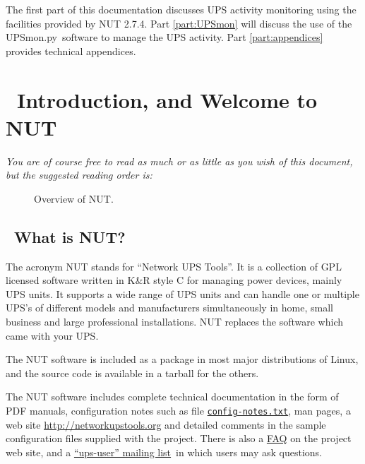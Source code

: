 \documentclass[12pt]{article}
\newlength{\headersep}\setlength{\headersep}{3mm}
\newcommand{\Hsep}{\hspace{\headersep}}
\newcommand{\newcolumn}{\vfill\eject}
\newcommand{\UPSmon}{\mbox{\textcolor{UPSMONCOLOUR}{UPSmon.py}}}
\newcommand{\mailinglist}{\href{https://lists.alioth.debian.org/mailman/listinfo/nut-upsuser}%
                               {``ups-user'' mailing list}}
\begin{document}
The first part of this documentation discusses UPS activity monitoring using
the facilities provided by NUT 2.7.4.  Part \ref{part:UPSmon} will discuss the
use of the \UPSmon\ software to manage the UPS activity.  Part
\ref{part:appendices} provides technical appendices.

\vspace{20mm}
\section{\Hsep\ Introduction, and Welcome to NUT}\label{section:intro}

\textsl{You are of course free to read as much or as little as you wish of
  this document, but the suggested reading order is:}

\begin{center}
\end{center}

\vspace*{\fill}

\begin{figure}[ht]
\begin{center}
\end{center}
\vspace{-6mm}
\caption{Overview of NUT.\label{fig:overview-OL}}
\end{figure}

\vspace*{\fill}

\newcolumn
\subsection{\Hsep\ What is NUT?}\label{whatisNUT}

The acronym NUT stands for ``Network UPS Tools''.  It is a collection of GPL
licensed software written in K\&R style C for managing power devices, mainly
UPS units.  It supports a wide range of UPS units and can handle one or
multiple UPS's of different models and manufacturers simultaneously in home,
small business and large professional installations.  NUT replaces the
software which came with your UPS.

The NUT software is included as a package in most major distributions of
Linux, and the source code is available in a tarball for the others.

The NUT software includes complete technical documentation in the form of PDF
manuals, configuration notes such as file
\href{https://github.com/networkupstools/nut/blob/master/docs/config-notes.txt}
     {\texttt{config{\allowbreak}-notes.txt}}, man pages, a web site
     \href{http://networkupstools.org}{http://{\allowbreak}networkupstools{\allowbreak}.org}
     and detailed comments in the sample configuration files supplied with the
     project.  There is also a
     \href{http://networkupstools.org/docs/FAQ.html}{FAQ} on the project web
     site, and a \mailinglist\ in which users may ask questions.
\end{document}
